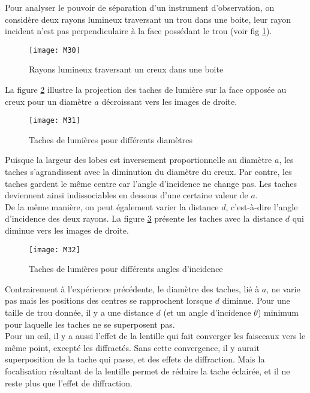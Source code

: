 \noindent Pour analyser le pouvoir de séparation d'un instrument d'observation, on considère deux rayons lumineux traversant un trou dans une boite, leur rayon incident n'est pas perpendiculaire à la face possédant le trou (voir fig \ref{d4}).

\begin{figure}[h]
    \centering
    \texttt{[image: M30]}
    \caption{Rayons lumineux traversant un creux dans une boite}
    \label{d4}
\end{figure}

\noindent La figure \ref{d6} illustre la projection des taches de lumière sur la face opposée au creux pour un diamètre $a$ décroissant vers les images de droite.

\begin{figure}[h]
    \centering
    \texttt{[image: M31]}
    \caption{Taches de lumières pour différents diamètres}
    \label{d6}
\end{figure}

\noindent Puisque la largeur des lobes est inversement proportionnelle au diamètre $a$, les taches s'agrandissent avec la diminution du diamètre du creux. Par contre, les taches gardent le même centre car l'angle d'incidence ne change pas.
Les taches deviennent ainsi indissociables en dessous d'une certaine valeur de $a$. \\

\noindent De la même manière, on peut également varier la distance $d$, c'est-à-dire l'angle d'incidence des deux rayons. La figure \ref{d8} présente les taches avec la distance $d$ qui diminue vers les images de droite.

\begin{figure}[h]
    \centering
    \texttt{[image: M32]}
    \caption{Taches de lumières pour différents angles d'incidence}
    \label{d8}
\end{figure}

\noindent Contrairement à l'expérience précédente, le diamètre des taches, lié à $a$, ne varie pas mais les positions des centres se rapprochent lorsque $d$ diminue. Pour une taille de trou donnée, il y a une distance $d$ (et un angle d'incidence $\theta$) minimum pour laquelle les taches ne se superposent pas. \\

\noindent Pour un œil, il y a aussi l’effet de la lentille qui fait converger les faisceaux vers le même point, excepté les diffractés. Sans cette convergence, il y aurait superposition de la tache qui passe, et des effets de diffraction. Mais la focalisation résultant de la lentille permet de réduire la tache éclairée, et il ne reste plus que l’effet de diffraction.\\

